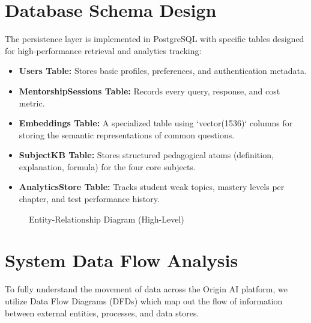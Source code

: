 \section{Database Schema Design}

The persistence layer is implemented in PostgreSQL with specific tables designed for high-performance retrieval and analytics tracking:

\begin{itemize}
    \item \textbf{Users Table:} Stores basic profiles, preferences, and authentication metadata.
    \item \textbf{MentorshipSessions Table:} Records every query, response, and cost metric.
    \item \textbf{Embeddings Table:} A specialized table using `vector(1536)` columns for storing the semantic representations of common questions.
    \item \textbf{SubjectKB Table:} Stores structured pedagogical atoms (definition, explanation, formula) for the four core subjects.
    \item \textbf{AnalyticsStore Table:} Tracks student weak topics, mastery levels per chapter, and test performance history.
\end{itemize}

\begin{figure}[htbp]
\centering
{}
\caption{Entity-Relationship Diagram (High-Level)}
\label{fig:erd}
\end{figure}

\section{System Data Flow Analysis}

To fully understand the movement of data across the Origin AI platform, we utilize Data Flow Diagrams (DFDs) which map out the flow of information between external entities, processes, and data stores. 

